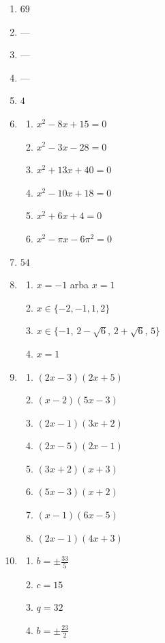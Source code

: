 \documentclass[12pt, a4paper]{scrartcl}
\begin{document}
\begin{enumerate}[label=\textbf{\arabic* užduotis.}, leftmargin=*]
    \item $69$
    \item ---
    \item ---
    \item ---
    \item $4$
    \item
    \begin{enumerate}[label={(\arabic*)}]
        \item $x^2-8x+15=0$
        \item $x^2-3x-28=0$
        \item $x^2+13x+40=0$
        \item $x^2-10x+18=0$
        \item $x^2+6x+4=0$
        \item $x^2-\pi x-6\pi^2=0$
    \end{enumerate}
    \item $54$
    \item
    \begin{enumerate}[label={(\arabic*)}]
        \item $x=-1$ arba $x=1$
        \item $x\in\{-2,-1,1,2\}$
        \item $x\in\{-1,\,2-\sqrt{6},\,2+\sqrt{6},\,5\}$
        \item $x=1$
    \end{enumerate}
    \item
    \begin{enumerate}[label={(\arabic*)}]
        \item $(2x-3)(2x+5)$
        \item $(x-2)(5x-3)$
        \item $(2x-1)(3x+2)$
        \item $(2x-5)(2x-1)$
        \item $(3x+2)(x+3)$
        \item $(5x-3)(x+2)$
        \item $(x-1)(6x-5)$
        \item $(2x-1)(4x+3)$
    \end{enumerate}
    \item
    \begin{enumerate}[label={(\arabic*)}]
        \item $b=\pm\frac{33}{5}$
        \item $c=15$
        \item $q=32$
        \item $b=\pm\frac{23}{2}$
    \end{enumerate}
\end{enumerate}
\end{document}
